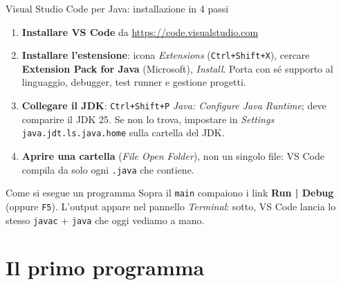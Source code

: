 \documentclass[10pt,aspectratio=169]{beamer}
\begin{document}
\begin{frame}[fragile]{Visual Studio Code per Java: installazione in 4 passi}
\small
\begin{enumerate}\itemsep=2pt
    \item \textbf{Installare VS Code} da \url{https://code.visualstudio.com}
    \item \textbf{Installare l'estensione}: icona \emph{Extensions} (\texttt{Ctrl+Shift+X}), cercare \textbf{Extension Pack for Java} (Microsoft), \emph{Install}. Porta con sé supporto al linguaggio, debugger, test runner e gestione progetti.
    \item \textbf{Collegare il JDK}: \texttt{Ctrl+Shift+P} \textrightarrow{} \emph{Java: Configure Java Runtime}; deve comparire il JDK 25. Se non lo trova, impostare in \emph{Settings} \texttt{java.jdt.ls.java.home} sulla cartella del JDK.
    \item \textbf{Aprire una cartella} (\emph{File \textrightarrow{} Open Folder}), non un singolo file: VS Code compila da solo ogni \texttt{.java} che contiene.
\end{enumerate}


\begin{block}{Come si esegue un programma}
Sopra il \texttt{main} compaiono i link \textbf{Run | Debug} (oppure \texttt{F5}). L'output appare nel pannello \emph{Terminal}: sotto, VS Code lancia lo stesso \texttt{javac} + \texttt{java} che oggi vediamo a mano.
\end{block}
\end{frame}

\section{Il primo programma}
\end{document}
